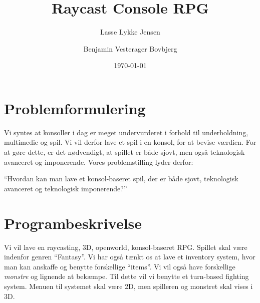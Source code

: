 \documentclass[11pt]{article}
\author{Lasse Lykke Jensen \and Benjamin Vesterager Bovbjerg}
\date{\today}
\title{Raycast Console RPG}
\begin{document}
\maketitle

\section*{Problemformulering}
Vi syntes at konsoller i dag er meget undervurderet i forhold til underholdning,
multimedie og spil. Vi vil derfor lave et spil i en konsol, for at bevise
værdien. For at gøre dette, er det nødvendigt, at spillet er både sjovt, men
også teknologisk avanceret og imponerende. Vores problemstilling lyder derfor:

``Hvordan kan man lave et konsol-baseret spil, der er både sjovt, teknologisk
avanceret og teknologisk imponerende?''

\section*{Programbeskrivelse}
Vi vil lave en raycasting, 3D, openworld, konsol-baseret RPG. Spillet skal være
indenfor genren ``Fantasy''. Vi har også tænkt os at lave et inventory system,
hvor man kan anskaffe og benytte forskellige ``items''. Vi vil også have
forskellige \textit{monstre} og lignende at bekæmpe. Til dette vil vi benytte et
turn-based fighting system. Menuen til systemet skal være 2D, men spilleren og
monstret skal vises i 3D.
\end{document}
